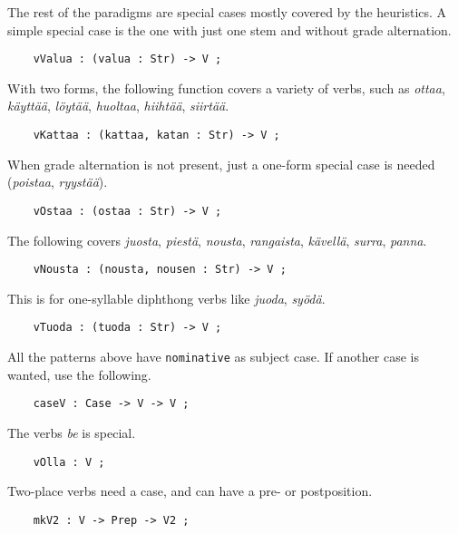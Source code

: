\documentclass[11pt,a4paper]{article}
\begin{document}
The rest of the paradigms are special cases mostly covered by the heuristics.
A simple special case is the one with just one stem and without grade alternation.

\begin{verbatim}
    vValua : (valua : Str) -> V ;
\end{verbatim}

With two forms, the following function covers a variety of verbs, such as
\textit{ottaa}, \textit{käyttää}, \textit{löytää}, \textit{huoltaa}, \textit{hiihtää}, \textit{siirtää}.

\begin{verbatim}
    vKattaa : (kattaa, katan : Str) -> V ;
\end{verbatim}

When grade alternation is not present, just a one-form special case is needed
(\textit{poistaa}, \textit{ryystää}).

\begin{verbatim}
    vOstaa : (ostaa : Str) -> V ;
\end{verbatim}

The following covers 
\textit{juosta}, \textit{piestä}, \textit{nousta}, \textit{rangaista}, \textit{kävellä}, \textit{surra}, \textit{panna}.

\begin{verbatim}
    vNousta : (nousta, nousen : Str) -> V ;
\end{verbatim}

This is for one-syllable diphthong verbs like \textit{juoda}, \textit{syödä}.

\begin{verbatim}
    vTuoda : (tuoda : Str) -> V ;
\end{verbatim}

All the patterns above have \texttt{nominative} as subject case.
If another case is wanted, use the following.

\begin{verbatim}
    caseV : Case -> V -> V ;
\end{verbatim}

The verbs \textit{be} is special.

\begin{verbatim}
    vOlla : V ;
\end{verbatim}

Two-place verbs need a case, and can have a pre- or postposition.

\begin{verbatim}
    mkV2 : V -> Prep -> V2 ;
\end{verbatim}
\end{document}
